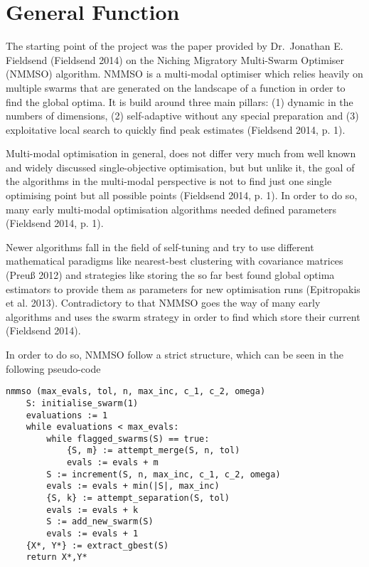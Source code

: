 \documentclass[12pt,a4paper]{article}
\begin{document}
\section{General Function}\label{general-function}

The starting point of the project was the paper provided by Dr.~Jonathan
E. Fieldsend (Fieldsend 2014) on the Niching Migratory Multi-Swarm
Optimiser (NMMSO) algorithm. NMMSO is a multi-modal optimiser which
relies heavily on multiple swarms that are generated on the landscape of
a function in order to find the global optima. It is build around three
main pillars: (1) dynamic in the numbers of dimensions, (2)
self-adaptive without any special preparation and (3) exploitative local
search to quickly find peak estimates (Fieldsend 2014, p. 1).

Multi-modal optimisation in general, does not differ very much from well
known and widely discussed single-objective optimisation, but but unlike
it, the goal of the algorithms in the multi-modal perspective is not to
find just one single optimising point but all possible points (Fieldsend
2014, p. 1). In order to do so, many early multi-modal optimisation
algorithms needed defined parameters (Fieldsend 2014, p. 1).

Newer algorithms fall in the field of self-tuning and try to use
different mathematical paradigms like nearest-best clustering with
covariance matrices (Preuß 2012) and strategies like storing the so far
best found global optima estimators to provide them as parameters for
new optimisation runs (Epitropakis et al. 2013). Contradictory to that
NMMSO goes the way of many early algorithms and uses the swarm strategy
in order to find which store their current (Fieldsend 2014).

In order to do so, NMMSO follow a strict structure, which can be seen in
the following pseudo-code

\begin{verbatim}
nmmso (max_evals, tol, n, max_inc, c_1, c_2, omega)
    S: initialise_swarm(1)
    evaluations := 1
    while evaluations < max_evals:
        while flagged_swarms(S) == true:
            {S, m} := attempt_merge(S, n, tol)
            evals := evals + m
        S := increment(S, n, max_inc, c_1, c_2, omega)
        evals := evals + min(|S|, max_inc)
        {S, k} := attempt_separation(S, tol)
        evals := evals + k
        S := add_new_swarm(S)
        evals := evals + 1
    {X*, Y*} := extract_gbest(S)
    return X*,Y*
\end{verbatim}
\end{document}
